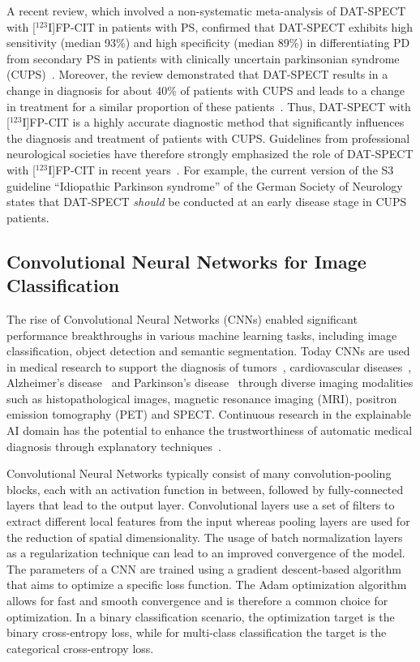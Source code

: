A recent review, which involved a non-systematic meta-analysis of DAT-SPECT with [$^{123}$I]FP-CIT in patients with PS, 
confirmed that DAT-SPECT exhibits high sensitivity (median 93\%) and high specificity (median 89\%) 
in differentiating PD from secondary PS in patients with 
clinically uncertain parkinsonian syndrome (CUPS)~\citep{Buchert2019-ya}.
Moreover, the review demonstrated that DAT-SPECT results in a change in diagnosis for about 40\% of patients with CUPS
and leads to a change in treatment for a similar proportion of these patients~\citep{Buchert2019-ya}. 
Thus, DAT-SPECT with [$^{123}$I]FP-CIT is a highly accurate diagnostic method
that significantly influences the diagnosis and treatment of patients with CUPS.
Guidelines from professional neurological societies have therefore strongly emphasized 
the role of DAT-SPECT with [$^{123}$I]FP-CIT in recent years~\citep{Tatsch2013}.
For example, the current version of the S3 guideline “Idiopathic Parkinson syndrome” of the 
German Society of Neurology states that DAT-SPECT \textit{should} be conducted at an early disease stage in CUPS patients.

\subsection{Convolutional Neural Networks for Image Classification}
\label{subsec:randfors}

The rise of Convolutional Neural Networks (CNNs) enabled significant performance breakthroughs 
in various machine learning tasks, including image classification, object detection and semantic segmentation.
Today CNNs are used in medical research to support the diagnosis 
of tumors~\citep{Tiwari2022-wr, Gunashekar2022-rl, Gao2021-zu}, 
cardiovascular diseases~\citep{Yoon2023-ik, Li2022-yn}, 
Alzheimer's disease~\citep{Basaia2019-pg, Folego2020-ak} 
and Parkinson's disease~\citep{Hathaliya2022, Magesh2020, Li2023-ym}
through diverse imaging modalities such as
histopathological images, magnetic resonance imaging (MRI), positron emission tomography (PET) and SPECT.
Continuous research in the explainable AI domain has the potential to enhance the trustworthiness 
of automatic medical diagnosis through explanatory techniques~\citep{Ribeiro2016, Petsiuk2018, Dhurandhar2018, Chaddad2023-zl}.

Convolutional Neural Networks typically consist of many convolution-pooling blocks, 
each with an activation function in between, followed by fully-connected layers that lead to the output layer.
Convolutional layers use a set of filters to extract different local features from the input 
whereas pooling layers are used for the reduction of spatial dimensionality.
The usage of batch normalization layers as a regularization technique can lead to an improved convergence of the model.
The parameters of a CNN are trained using a gradient descent-based algorithm that aims to optimize a specific loss function.
The Adam optimization algorithm~\citep{Diederik2015} allows for fast and smooth convergence 
and is therefore a common choice for optimization.
In a binary classification scenario, the optimization target is the binary cross-entropy loss,
while for multi-class classification the target is the categorical cross-entropy loss.

